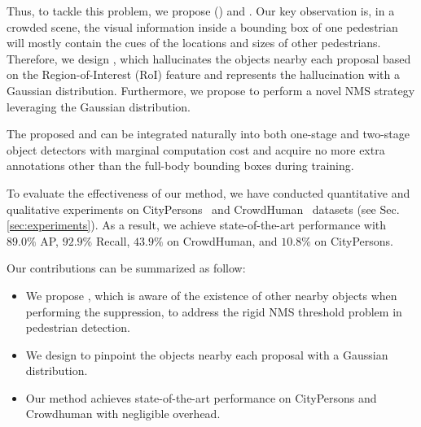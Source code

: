 \documentclass[sigconf]{acmart}
\begin{document}
Thus, to tackle this problem, we propose \heatmapname{} (\heatmapnameshort{}) and \nmsname{}. Our key observation is, in a crowded scene, the visual information inside a bounding box of one pedestrian will mostly contain the cues of the locations and sizes of other pedestrians. Therefore, we design \heatmapnameshort{}, which hallucinates the objects nearby each proposal based on the Region-of-Interest (RoI) feature and represents the hallucination with a Gaussian distribution. Furthermore, we propose \nmsname{} to perform a novel NMS strategy leveraging the Gaussian distribution.

The proposed \heatmapnameshort{} and \nmsname{} can be integrated naturally into both one-stage and two-stage object detectors with marginal computation cost and acquire no more extra annotations other than the full-body bounding boxes during training.

To evaluate the effectiveness of our method, we have conducted quantitative and qualitative experiments on CityPersons~\cite{citypersons} and CrowdHuman~\cite{crowdhuman} datasets (see Sec. \ref{sec:experiments}). As a result, we achieve state-of-the-art performance with $89.0\%$ AP, $92.9\%$ Recall, $43.9\%$ \mr{} on CrowdHuman, and $10.8\%$ \mr{} on CityPersons.

Our contributions can be summarized as follow:
\begin{itemize}
  \item We propose \nmsname{}, which is aware of the existence of other nearby objects when performing the suppression, to address the rigid NMS threshold problem in pedestrian detection.
  \item We design \heatmapnameshort{} to pinpoint the objects nearby each proposal with a Gaussian distribution.
  \item Our method achieves state-of-the-art performance on CityPersons and Crowdhuman with negligible overhead.
\end{itemize}
\end{document}
